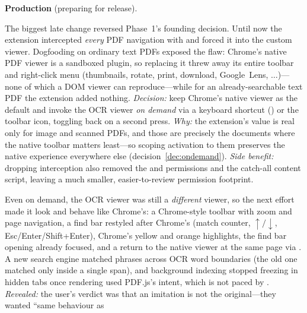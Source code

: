\medskip
\noindent\textbf{Production} (preparing for release).
\begin{description}[leftmargin=1.4em, style=nextline, itemsep=4pt]
  \item[Phase 12 --- Activation model: from automatic to on demand.] The biggest
        late change reversed Phase~1's founding decision. Until now the extension
        intercepted \emph{every} PDF navigation with 
        and forced it into the custom viewer. Dogfooding on ordinary text PDFs
        exposed the flaw: Chrome's native PDF viewer is a sandboxed plugin, so
        replacing it threw away its entire toolbar and right-click menu
        (thumbnails, rotate, print, download, Google~Lens, $\dots$)---none of which
        a DOM viewer can reproduce---while for an already-searchable text PDF the
        extension added nothing. \emph{Decision:} keep Chrome's native viewer as
        the default and invoke the OCR viewer \emph{on demand} via a keyboard
        shortcut () or the toolbar icon, toggling back on a
        second press. \emph{Why:} the extension's value is real only for image and
        scanned PDFs, and those are precisely the documents where the native
        toolbar matters least---so scoping activation to them preserves the native
        experience everywhere else (decision~\ref{dec:ondemand}). \emph{Side
        benefit:} dropping interception also removed the 
        and  permissions and the catch-all content script, leaving a
        much smaller, easier-to-review permission footprint.
  \item[Phase 13 --- Imitating the native viewer.] Even on demand, the OCR viewer
        was still a \emph{different} viewer, so the next effort made it look and
        behave like Chrome's: a Chrome-style toolbar with zoom and page
        navigation, a find bar restyled after Chrome's (match counter,
        $\uparrow/\downarrow$, Esc/Enter/Shift+Enter), Chrome's yellow and orange
        highlights, the find bar opening already focused, and a return to the
        native viewer at the same page via . A new search engine
        matched phrases across OCR word boundaries (the old one matched only
        inside a single span), and background indexing stopped freezing in hidden
        tabs once rendering used PDF.js's  intent, which is not paced
        by . \emph{Revealed:} the user's verdict was
        that an imitation is not the original---they wanted ``same behaviour as

\end{description}
